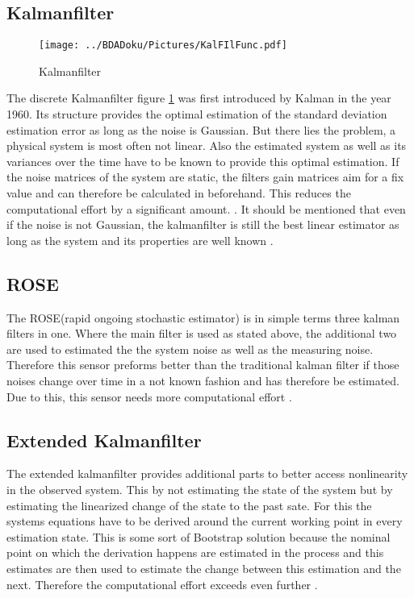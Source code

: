   \subsection{Kalmanfilter}
  
  \begin{figure}[h!]
  \centering
  \texttt{[image: ../BDADoku/Pictures/KalFIlFunc.pdf]}
  \caption{Kalmanfilter}
  \label{fig:Kalmanfilter}
  \end{figure}
 
  The discrete Kalmanfilter figure \ref{fig:Kalmanfilter} was first introduced by Kalman in the year 1960.
  Its structure provides the optimal estimation of the standard deviation estimation error as long as the noise is Gaussian.
  But there lies the problem, a physical system is most often not linear.
  Also the estimated system as well as its variances over the time have to be known to provide this optimal estimation.
  If the noise matrices of the system are static, the filters gain matrices aim for a fix value and can therefore be calculated in beforehand.
  This reduces the computational effort by a significant amount. \cite{DavidWSchultz2004}.
  It should be mentioned that even if the noise is not Gaussian, the kalmanfilter is still the best
  linear estimator as long as the system and its properties are well known \cite{SimonDan2006Ose:}.
  
  \subsection{ROSE}
  The ROSE(rapid ongoing stochastic estimator) is in simple terms three kalman filters in one.
  Where the main filter is used as stated above, the additional two are used to estimated the 
  the system noise as well as the measuring noise. Therefore this sensor preforms better than the traditional kalman filter
  if those noises change over time in a not known fashion and has therefore be estimated.
  Due to this, this sensor needs more computational effort \cite{DavidWSchultz2004}. 
  
  \subsection{Extended Kalmanfilter}
  The extended kalmanfilter provides additional parts to better access nonlinearity in the observed system.
  This by not estimating the state of the system but by estimating the linearized change of the state 
  to the past sate. For this the systems equations have to be derived around the current working point in every estimation state.
  This is some sort of Bootstrap solution because the nominal point on which the derivation happens are estimated in the process and
  this estimates are then used to estimate the change between this estimation and the next.
  Therefore the computational effort exceeds even further \cite{SimonDan2006Ose:}.
  
